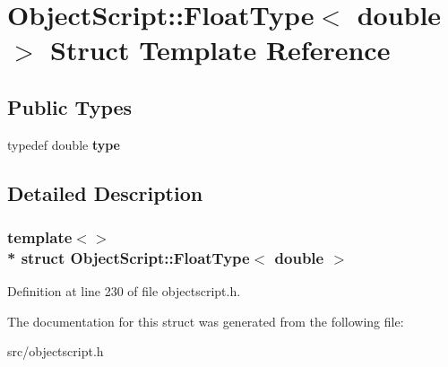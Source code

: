 \hypertarget{struct_object_script_1_1_float_type_3_01double_01_4}{}\section{Object\+Script\+:\+:Float\+Type$<$ double $>$ Struct Template Reference}
\label{struct_object_script_1_1_float_type_3_01double_01_4}
\subsection*{Public Types}
\begin{DoxyCompactItemize}
\item 
typedef double {\bfseries type}\hypertarget{struct_object_script_1_1_float_type_3_01double_01_4_aacd836754d712a2121a10dd5fccc30c6}{}\label{struct_object_script_1_1_float_type_3_01double_01_4_aacd836754d712a2121a10dd5fccc30c6}

\end{DoxyCompactItemize}


\subsection{Detailed Description}
\subsubsection*{template$<$$>$\\*
struct Object\+Script\+::\+Float\+Type$<$ double $>$}



Definition at line 230 of file objectscript.\+h.



The documentation for this struct was generated from the following file\+:\begin{DoxyCompactItemize}
\item 
src/objectscript.\+h\end{DoxyCompactItemize}
